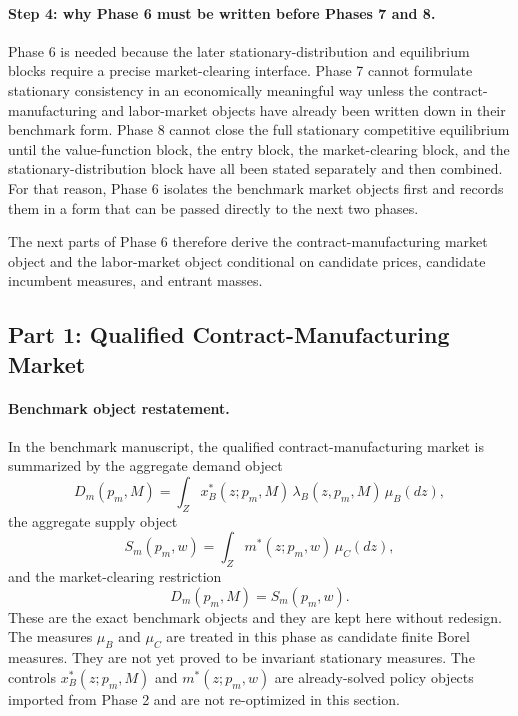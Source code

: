 \paragraph{Step 4: why Phase 6 must be written before Phases 7 and 8.}
Phase 6 is needed because the later stationary-distribution and equilibrium blocks require a precise market-clearing interface. Phase 7 cannot formulate stationary consistency in an economically meaningful way unless the contract-manufacturing and labor-market objects have already been written down in their benchmark form. Phase 8 cannot close the full stationary competitive equilibrium until the value-function block, the entry block, the market-clearing block, and the stationary-distribution block have all been stated separately and then combined. For that reason, Phase 6 isolates the benchmark market objects first and records them in a form that can be passed directly to the next two phases.

The next parts of Phase 6 therefore derive the contract-manufacturing market object and the labor-market object conditional on candidate prices, candidate incumbent measures, and entrant masses.

\subsection{Part 1: Qualified Contract-Manufacturing Market}

\paragraph{Benchmark object restatement.}
In the benchmark manuscript, the qualified contract-manufacturing market is summarized by the aggregate demand object
\[
D_m(p_m,M)=\int_Z x_B^*(z;p_m,M)\,\lambda_B(z,p_m,M)\,\mu_B(dz),
\]
the aggregate supply object
\[
S_m(p_m,w)=\int_Z m^*(z;p_m,w)\,\mu_C(dz),
\]
and the market-clearing restriction
\[
D_m(p_m,M)=S_m(p_m,w).
\]
These are the exact benchmark objects and they are kept here without redesign. The measures $\mu_B$ and $\mu_C$ are treated in this phase as candidate finite Borel measures. They are not yet proved to be invariant stationary measures. The controls $x_B^*(z;p_m,M)$ and $m^*(z;p_m,w)$ are already-solved policy objects imported from Phase 2 and are not re-optimized in this section.

